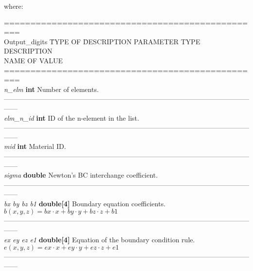 \documentclass[a4paper]{article}
\begin{document}
\begin{flushleft}
where:
\end{flushleft}
\vspace{-20pt}
\small
\begin{tabbing}
=================================================\\
Output\_digits	\qquad \quad	\= TYPE OF \quad\qquad  	\=DESCRIPTION\kill
PARAMETER	 			 				\> TYPE		 					\>DESCRIPTION\\
NAME										\> OF VALUE					\>\\
=================================================\\
\textit{n\_elm} 			\> \textbf{int}						\>Number of elements.\\
------------------------------------------------------------------------------------------------------------------\\
\textit{elm\_n\_id} 	\> \textbf{int} 					\>ID of the n-element in the list.\\
------------------------------------------------------------------------------------------------------------------\\
\textit{mid}	 				\> \textbf{int}						\>Material ID.\\
------------------------------------------------------------------------------------------------------------------\\
\textit{sigma}	 			\> \textbf{double}				\>Newton's BC interchange coefficient.\\ %
------------------------------------------------------------------------------------------------------------------\\
\textit{bx by bz b1}	\> \textbf{double[4]}			\>Boundary equation coefficients. \\
                      \>                        \> $b(x,y,z) = bx \cdot x + by \cdot y + bz \cdot z + b1$ \\
------------------------------------------------------------------------------------------------------------------\\
\textit{ex ey ez e1}	\> \textbf{double[4]}			\>Equation of the boundary condition rule. \\
                      \>                        \> $e(x,y,z) = ex \cdot x + ey \cdot y + ez \cdot z + e1$ \\
------------------------------------------------------------------------------------------------------------------\\
\end{tabbing}

\normalsize
\end{document}
